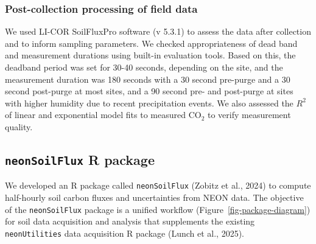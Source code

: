 \documentclass[
  letterpaper,
  DIV=11,
  numbers=noendperiod]{scrartcl}
\begin{document}
\normalsize

\subsubsection{Post-collection processing of field
data}\label{post-collection-processing-of-field-data}

We used LI-COR SoilFluxPro software (v 5.3.1) to assess the data after
collection and to inform sampling parameters. We checked appropriateness
of dead band and measurement durations using built-in evaluation tools.
Based on this, the deadband period was set for 30-40 seconds, depending
on the site, and the measurement duration was 180 seconds with a 30
second pre-purge and a 30 second post-purge at most sites, and a 90
second pre- and post-purge at sites with higher humidity due to recent
precipitation events. We also assessed the \(R^{2}\) of linear and
exponential model fits to measured CO\(_{2}\) to verify measurement
quality.

\subsection{\texorpdfstring{\texttt{neonSoilFlux} R
package}{neonSoilFlux R package}}\label{sec-nsf-desc}

We developed an R package called \texttt{neonSoilFlux} (Zobitz et al.,
2024) to compute half-hourly soil carbon fluxes and uncertainties from
NEON data. The objective of the \texttt{neonSoilFlux} package is a
unified workflow (Figure~\ref{fig-package-diagram}) for soil data
acquisition and analysis that supplements the existing
\texttt{neonUtilities} data acquisition R package (Lunch et al., 2025).
\end{document}
